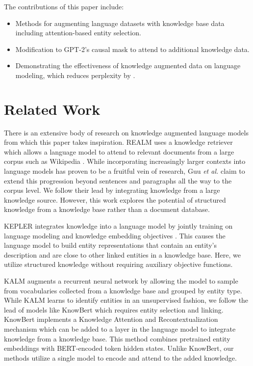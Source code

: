 \documentclass[phd,electronic,oneside,twosidetoc,letterpaper,chaptercenter,parttop,lof]{byumsphd}
\begin{document}
The contributions of this paper include:
\begin{itemize}
    \item Methods for augmenting language datasets with knowledge base data including attention-based entity selection.
    \item Modification to GPT-2's causal mask to attend to additional knowledge data.
    \item Demonstrating the effectiveness of knowledge augmented data on language modeling, which reduces perplexity by \LMLossPercentageDecrease.
\end{itemize}

\section{Related Work}

There is an extensive body of research on knowledge augmented language models from which this paper takes inspiration.
REALM uses a knowledge retriever which allows a language model to attend to relevant documents from a large corpus such as Wikipedia \cite{guu2020realm}. 
While incorporating increasingly larger contexts into language models has proven to be a fruitful vein of research, Guu \textit{et al.} claim to extend this progression beyond sentences and paragraphs all the way to the corpus level. 
We follow their lead by integrating knowledge from a large knowledge source.
However, this work explores the potential of structured knowledge from a knowledge base rather than a document database.

KEPLER integrates knowledge into a language model by jointly training on language modeling and knowledge embedding objectives \cite{wang2021kepler}.
This causes the language model to build entity representations that contain an entity's description and are close to other linked entities in a knowledge base.
Here, we utilize structured knowledge without requiring auxiliary objective functions.

KALM augments a recurrent neural network \cite{liu2019knowledge} by allowing the model to sample from vocabularies collected from a knowledge base and grouped by entity type.
While KALM learns to identify entities in an unsupervised fashion, we follow the lead of models like KnowBert \cite{peters2019knowledge} which requires entity selection and linking. 
KnowBert implements a Knowledge Attention and Recontextualization
mechanism which can be added to a layer in the language model to integrate knowledge from a knowledge base.
This method combines pretrained entity embeddings with BERT-encoded token hidden states.
Unlike KnowBert, our methods utilize a single model to encode and attend to the added knowledge.
\end{document}
